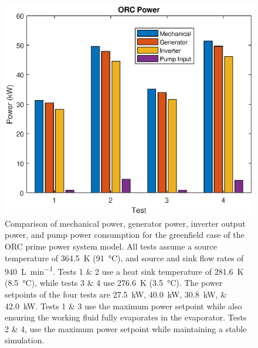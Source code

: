 \begin{figure}[h]
	\centering

	\includegraphics[width=\textwidth]{figures/gfPower}

	\caption{Comparison of mechanical power, generator power, inverter output power, and pump power consumption for the greenfield case of the ORC prime power system model. All tests assume a source temperature of \SI{364.5}{\kelvin} (\SI{91}{\degreeCelsius}), and source and sink flow rates of \SI{940}{\liter\per\minute}. Tests 1 \& 2 use a heat sink temperature of \SI{281.6}{\kelvin} (\SI{8.5}{\degreeCelsius}), while tests 3 \& 4 use \SI{276.6}{\kelvin} (\SI{3.5}{\degreeCelsius}). The power setpoints of the four tests are \SIlist{27.5;40.0;30.8;42.0}{\kilo\watt}. Tests 1 \& 3 use the maximum power setpoint while also ensuring the working fluid fully evaporates in the evaporator. Tests 2 \& 4, use the maximum power setpoint while maintaining a stable simulation. }
	\label{fig:gfPower}
\end{figure}